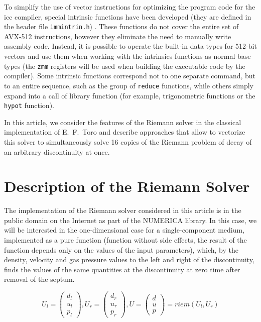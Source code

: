 \documentclass[utf8,english]{psta}%
\begin{document}
To simplify the use of vector instructions for optimizing the program code for the icc compiler, special intrinsic functions have been developed (they are defined in the header file \texttt{immintrin.h}) \cite{IntelIntrGuide}.
These functions do not cover the entire set of AVX-512 instructions, however they eliminate the need to manually write assembly code.
Instead, it is possible to operate the built-in data types for 512-bit vectors and use them when working with the intrinsics functions as normal base types (the \texttt{zmm} registers will be used when building the executable code by the compiler).
Some intrinsic functions correspond not to one separate command, but to an entire sequence, such as the group of \texttt{reduce} functions, while others simply expand into a call of library function (for example, trigonometric functions or the \texttt{hypot} function).

In this article, we consider the features of the Riemann solver in the classical implementation of E.~F.~Toro \cite{TorRiemann} and describe approaches that allow to vectorize this solver to simultaneously solve 16 copies of the Riemann problem of decay of an arbitrary discontinuity at once.

\section{Description of the Riemann Solver}

The implementation of the Riemann solver considered in this article is in the public domain on the Internet as part of the NUMERICA \cite{Numerica} library.
In this case, we will be interested in the one-dimensional case for a single-component medium, implemented as a pure function (function without side effects, the result of the function depends only on the values of the input parameters), which, by the density, velocity and gas pressure values to the left and right of the discontinuity, finds the values of the same quantities at the discontinuity at zero time after removal of the septum.

\begin{equation}\label{eq:riemann}
U_l = \left( \begin{array}{ccc} d_l \\ u_l \\ p_l \end{array} \right),
U_r = \left( \begin{array}{ccc} d_r \\ u_r \\ p_r \end{array} \right),
U = \left( \begin{array}{ccc} d \\ u \\ p \end{array} \right) = riem(U_l, U_r)
\end{equation}
\end{document}
